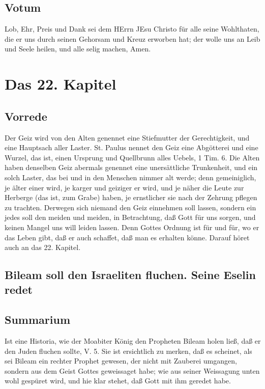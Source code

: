 \section{Votum}

Lob, Ehr, Preis und Dank sei dem HErrn JEsu Christo für alle seine Wohlthaten, die er uns durch seinen Gehorsam und Kreuz erworben hat; der wolle uns an Leib und Seele heilen, und alle selig machen, Amen.

\chapter{Das 22. Kapitel}

\section{Vorrede}

Der Geiz wird von den Alten genennet eine Stiefmutter der Gerechtigkeit, und eine Hauptsach aller Laster. St. Paulus nennet den Geiz eine Abgötterei und eine Wurzel, das ist, einen Ursprung und Quellbrunn alles Uebels, 1 Tim. 6. Die Alten haben denselben Geiz abermals genennet eine unersättliche Trunkenheit, und ein solch Laster, das bei und in den Menschen nimmer alt werde; denn gemeiniglich, je älter einer wird, je karger und geiziger er wird, und je näher die Leute zur Herberge (das ist, zum Grabe) haben, je ernstlicher sie nach der Zehrung pflegen zu trachten. Derwegen sich niemand den Geiz einnehmen soll lassen, sondern ein jedes soll den meiden und meiden, in Betrachtung, daß Gott für uns sorgen, und keinen Mangel uns will leiden lassen. Denn Gottes Ordnung ist für und für, wo er das Leben gibt, daß er auch schaffet, daß man es erhalten könne. Darauf höret auch an das 22. Kapitel.

\section{Bileam soll den Israeliten fluchen. Seine Eselin redet}

\section{Summarium}

Ist eine Historia, wie der Moabiter König den Propheten Bileam holen ließ, daß er den Juden fluchen sollte, V. 5. Sie ist ersichtlich zu merken, daß es scheinet, als sei Bileam ein rechter Prophet gewesen, der nicht mit Zauberei umgangen, sondern aus dem Geist Gottes geweissaget habe; wie aus seiner Weissagung unten wohl gespüret wird, und hie klar stehet, daß Gott mit ihm geredet habe.

